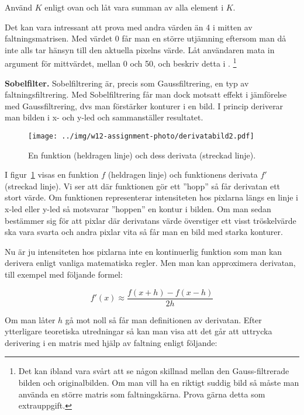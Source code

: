 Använd  $K$ enligt ovan och låt  vara summan av alla element i $K$. 

Det kan vara intressant att prova med andra värden än 4 i mitten av faltningsmatrisen. Med värdet 0 får man en större utjämning eftersom man då inte alls tar hänsyn till den aktuella pixelns värde. Låt användaren mata in argument för mittvärdet, mellan 0 och 50, och beskriv detta i . \footnote{Det kan ibland vara svårt att se någon skillnad mellan den Gauss-filtrerade bilden och originalbilden. Om man vill ha en riktigt suddig bild så måste man använda en större matris som faltningskärna. Prova gärna detta som extrauppgift. }


\Task  \textbf{Sobelfilter.} Sobelfiltrering är, precis som Gaussfiltrering, en typ av faltningsfiltrering. Med Sobelfiltrering får man dock motsatt effekt i jämförelse med Gaussfiltrering, dvs man förstärker konturer i en bild. I princip deriverar man bilden i x- och y-led och sammanställer resultatet.

\begin{figure}[H]
\texttt{[image: ../img/w12-assignment-photo/derivatabild2.pdf]}
\caption { En funktion (heldragen linje) och dess derivata (streckad linje).}
\label{fig:photo:sobelfilter:derivatabild}
\end{figure}

I figur~\ref{fig:photo:sobelfilter:derivatabild} visas en funktion $f$ (heldragen linje) och funktionens derivata $f'$ (streckad linje). Vi ser att där funktionen gör ett ''hopp'' så får derivatan ett stort värde. Om funktionen representerar intensiteten hos pixlarna längs en linje i x-led eller y-led så motsvarar ''hoppen'' en kontur i bilden. Om man sedan bestämmer sig för att pixlar där derivatans värde överstiger ett visst tröskelvärde ska vara svarta och andra pixlar vita så får man en bild med starka konturer.

Nu är ju intensiteten hos pixlarna inte en kontinuerlig funktion som man kan derivera enligt vanliga matematiska regler. Men man kan approximera derivatan, till exempel med följande formel:

\begin{displaymath}
f'(x) \approx \frac{f(x+h) - f(x-h)}{2h}
\end{displaymath}

Om man låter $h$ gå mot noll så får man definitionen av derivatan.
Efter ytterligare teoretiska utredningar så kan man visa att det går att uttrycka derivering i en matris med hjälp av faltning enligt följande:
% 


